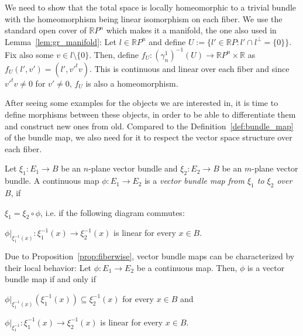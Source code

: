 \begin{examples}
\begin{i_enum}
We need to show that the total space is locally homeomorphic to a trivial bundle with the homeomorphism being linear isomorphism on each fiber. We use the standard open cover of $\mathbb{R}P^n$ which makes it a manifold, the one also used in Lemma~\ref{lem:gr_manifold}: Let $l\in\mathbb{R}P^n$ and define $U:=\{l'\in\mathbb{R}P:l'\cap l^{\perp}=\{0\}\}$. Fix also some $v\in l\setminus\{0\}$. Then, define $f_U:(\gamma_n^1)^{-1}(U)\to\mathbb{R}P^n\times\mathbb{R}$ as
$f_U(l',v')=(l',v'^tv)$.
This is continuous and linear over each fiber and since $v'^tv\neq0$ for $v'\neq0$, $f_U$ is also a homeomorphism.
\end{i_enum}
\end{examples}

After seeing some examples for the objects we are interested in, it is time to define morphisms between these objects, in order to be able to differentiate them and construct new ones from old. Compared to the Definition~\ref{def:bundle_map} of the bundle map, we also need for it to respect the vector space structure over each fiber.

\begin{definition}
Let $\xi_1:E_1\to B$ be an $n$-plane vector bundle and $\xi_2:E_2\to B$ be an $m$-plane vector bundle. A continuous map $\phi:E_1\to E_2$ is a \emph{vector bundle map from $\xi_1$ to $\xi_2$ over $B$}, if
\begin{i_enum}
\item $\xi_1=\xi_2\circ\phi$, i.e. if the following diagram commutes:
\begin{center}
\end{center}
\item $\phi|_{\xi_1^{-1}(x)}:\xi_1^{-1}(x)\to\xi_2^{-1}(x)$ is linear for every $x\in B$.
\end{i_enum}
\end{definition}
\begin{remark} Due to Proposition~\ref{prop:fiberwise}, vector bundle maps can be characterized by their local behavior: Let $\phi:E_1\to E_2$ be a continuous map. Then, $\phi$ is a vector bundle map if and only if
\begin{i_enum}
\item $\phi|_{\xi_1^{-1}(x)}(\xi_1^{-1}(x))\subseteq\xi_2^{-1}(x)$ for every $x\in B$ and
\item $\phi|_{\xi_1^{-1}}:\xi_1^{-1}(x)\to\xi_2^{-1}(x)$ is linear for every $x\in B$.
\end{i_enum}
\end{remark}

